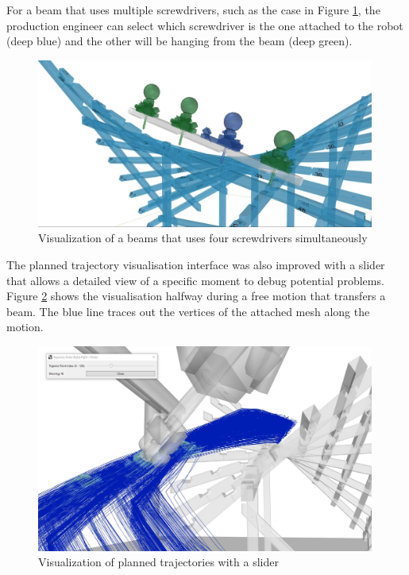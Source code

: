 For a beam that uses multiple screwdrivers, such as the case in Figure \ref{fig:beam-four-screwdrivers}, the production engineer can select which screwdriver is the one attached to the robot (deep blue) and the other will be hanging from the beam (deep green).

\begin{figure}[!h]
    \centering
    \includegraphics[width=0.99\textwidth]{images/7a/img89.jpg}
    \caption{Visualization of a beams that uses four screwdrivers simultaneously}
    \label{fig:beam-four-screwdrivers}
\end{figure}

The planned trajectory visualisation interface was also improved with a slider that allows a detailed view of a specific moment to debug potential problems. Figure \ref{fig:trajectory-slider} shows the visualisation halfway during a free motion that transfers a beam. The blue line traces out the vertices of the attached mesh along the motion.

\begin{figure}[!h]
    \centering
    \includegraphics[width=0.99\textwidth]{images/7a/img90.jpg}
    \caption{Visualization of planned trajectories with a slider}
    \label{fig:trajectory-slider}
\end{figure}

